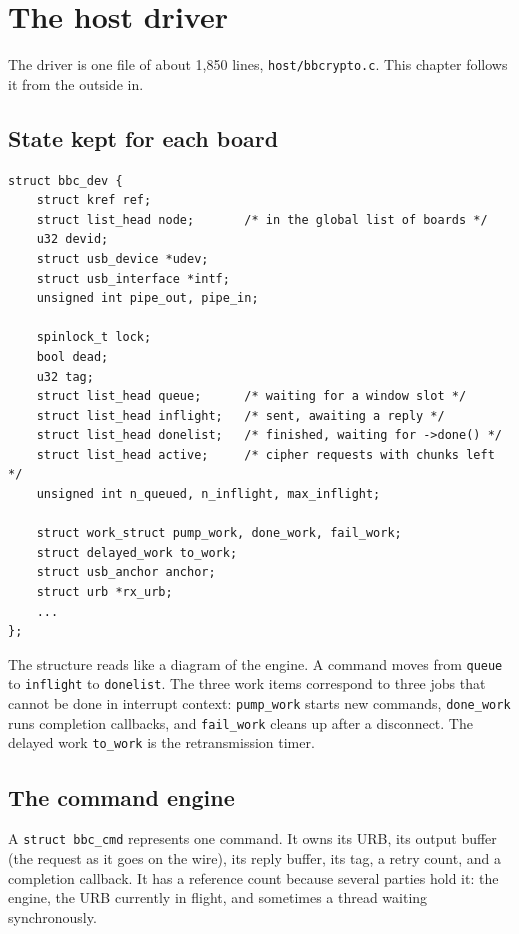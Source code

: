 \documentclass[11pt,a4paper,oneside]{report}
\newcommand{\code}[1]{\texttt{\small #1}}
\begin{document}
\chapter{The host driver}\label{ch:host}

The driver is one file of about 1,850 lines, \code{host/bbcrypto.c}. This chapter follows it from the outside in.

\section{State kept for each board}

\begin{lstlisting}
struct bbc_dev {
	struct kref ref;
	struct list_head node;       /* in the global list of boards */
	u32 devid;
	struct usb_device *udev;
	struct usb_interface *intf;
	unsigned int pipe_out, pipe_in;

	spinlock_t lock;
	bool dead;
	u32 tag;
	struct list_head queue;      /* waiting for a window slot */
	struct list_head inflight;   /* sent, awaiting a reply */
	struct list_head donelist;   /* finished, waiting for ->done() */
	struct list_head active;     /* cipher requests with chunks left */
	unsigned int n_queued, n_inflight, max_inflight;

	struct work_struct pump_work, done_work, fail_work;
	struct delayed_work to_work;
	struct usb_anchor anchor;
	struct urb *rx_urb;
	...
};
\end{lstlisting}

The structure reads like a diagram of the engine. A command moves from \code{queue} to \code{inflight} to \code{donelist}. The three work items correspond to three jobs that cannot be done in interrupt context: \code{pump\_work} starts new commands, \code{done\_work} runs completion callbacks, and \code{fail\_work} cleans up after a disconnect. The delayed work \code{to\_work} is the retransmission timer.

\section{The command engine}

A \code{struct bbc\_cmd} represents one command. It owns its URB, its output buffer (the request as it goes on the wire), its reply buffer, its tag, a retry count, and a completion callback. It has a reference count because several parties hold it: the engine, the URB currently in flight, and sometimes a thread waiting synchronously.
\end{document}
